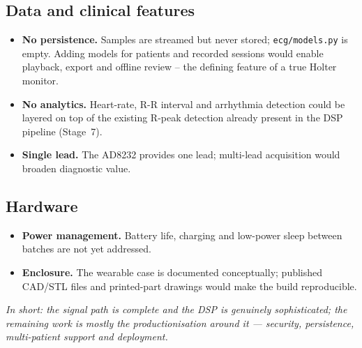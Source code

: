 \subsection{Data and clinical features}
\begin{itemize}[noitemsep]
  \item \textbf{No persistence.} Samples are streamed but never stored;
        \texttt{ecg/models.py} is empty. Adding models for patients and recorded
        sessions would enable playback, export and offline review -- the defining
        feature of a true Holter monitor.
  \item \textbf{No analytics.} Heart-rate, R-R interval and arrhythmia detection
        could be layered on top of the existing R-peak detection already present in
        the DSP pipeline (Stage~7).
  \item \textbf{Single lead.} The AD8232 provides one lead; multi-lead acquisition
        would broaden diagnostic value.
\end{itemize}

\subsection{Hardware}
\begin{itemize}[noitemsep]
  \item \textbf{Power management.} Battery life, charging and low-power sleep
        between batches are not yet addressed.
  \item \textbf{Enclosure.} The wearable case is documented conceptually; published
        CAD/STL files and printed-part drawings would make the build reproducible.
\end{itemize}

\bigskip
\noindent\emph{In short: the signal path is complete and the DSP is genuinely
sophisticated; the remaining work is mostly the productionisation around it ---
security, persistence, multi-patient support and deployment.}

